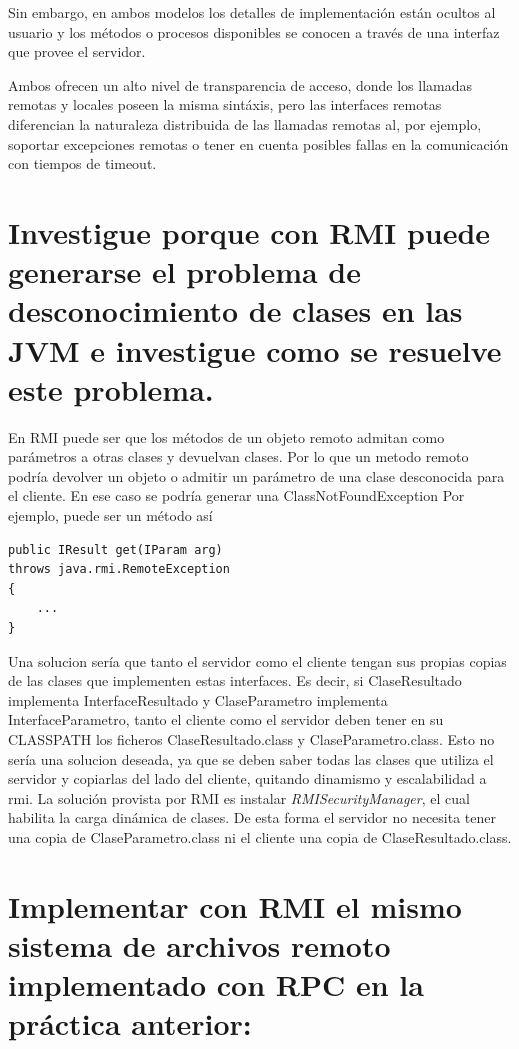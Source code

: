 \documentclass[osajnl,twocolumn,showpacs,superscriptaddress,10pt]{revtex4-1} %
\begin{document}
Sin embargo, en ambos modelos los detalles de implementación están ocultos al usuario
y los métodos o procesos disponibles se conocen a través de una interfaz
que provee el servidor.

Ambos ofrecen un alto nivel de transparencia de acceso, donde los llamadas remotas
y locales poseen la misma sintáxis, pero las interfaces remotas
diferencian la naturaleza distribuida de las llamadas remotas al, por
ejemplo, soportar excepciones remotas o tener en cuenta posibles fallas
en la comunicación con tiempos de timeout.

\section{Investigue porque con RMI puede generarse el problema de desconocimiento de clases en
las JVM e investigue como se resuelve este problema.}

En RMI puede ser que los métodos de un objeto remoto admitan como parámetros a otras clases y devuelvan clases.  Por lo que un metodo remoto podría devolver un objeto o admitir un parámetro de una clase desconocida para el cliente. En ese caso se podría generar una ClassNotFoundException
Por ejemplo, puede ser un método así

\begin{verbatim}
public IResult get(IParam arg)
throws java.rmi.RemoteException
{
    ...
}
\end{verbatim}


Una solucion sería que  tanto el servidor como el cliente tengan sus propias copias de las clases que implementen estas interfaces. Es decir, si ClaseResultado implementa InterfaceResultado y ClaseParametro implementa InterfaceParametro, tanto el cliente como el servidor deben tener en su CLASSPATH los ficheros ClaseResultado.class y ClaseParametro.class. Esto no sería una solucion deseada, ya que se deben saber todas las clases que utiliza el servidor y copiarlas del lado del cliente, quitando dinamismo y escalabilidad a rmi.
La solución provista por RMI es instalar \textit{RMISecurityManager}, el cual habilita la carga dinámica de clases. De esta forma el servidor no necesita tener una copia de ClaseParametro.class ni el cliente una copia de ClaseResultado.class. 

\section{Implementar con RMI el mismo sistema de archivos remoto implementado con RPC en la
práctica anterior:}
\end{document}
